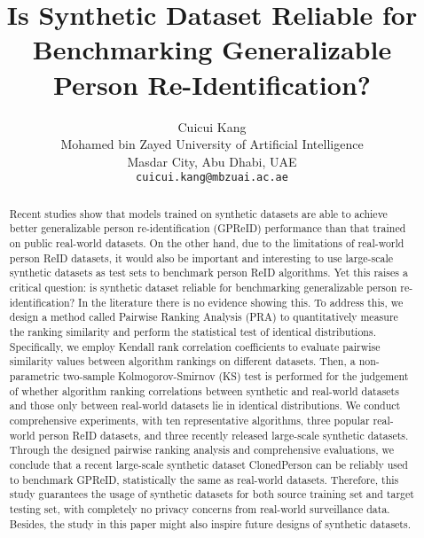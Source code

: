 \documentclass[10pt,twocolumn,letterpaper]{article}
\begin{document}
\title{Is Synthetic Dataset Reliable for Benchmarking Generalizable Person Re-Identification?}

\author{Cuicui Kang\\
Mohamed bin Zayed University of Artificial Intelligence\\
Masdar City, Abu Dhabi, UAE\\
{\tt\small cuicui.kang@mbzuai.ac.ae}
}

\maketitle
\thispagestyle{empty}

\begin{abstract}







Recent studies show that models trained on synthetic datasets are able to achieve better generalizable person re-identification (GPReID) performance than that trained on public real-world datasets. On the other hand, due to the limitations of real-world person ReID datasets, it would also be important and interesting to use large-scale synthetic datasets as test sets to benchmark person ReID algorithms. Yet this raises a critical question: is synthetic dataset reliable for benchmarking generalizable person re-identification? In the literature there is no evidence showing this. To address this, we design a method called Pairwise Ranking Analysis (PRA) to quantitatively measure the ranking similarity and perform the statistical test of identical distributions. Specifically, we employ Kendall rank correlation coefficients to evaluate pairwise similarity values between algorithm rankings on different datasets. Then, a non-parametric two-sample Kolmogorov-Smirnov (KS) test is performed for the judgement of whether algorithm ranking correlations between synthetic and real-world datasets and those only between real-world datasets lie in identical distributions. We conduct comprehensive experiments, with ten representative algorithms, three popular real-world person ReID datasets, and three recently released large-scale synthetic datasets. Through the designed pairwise ranking analysis and comprehensive evaluations, we conclude that a recent large-scale synthetic dataset ClonedPerson can be reliably used to benchmark GPReID, statistically the same as real-world datasets. Therefore, this study guarantees the usage of synthetic datasets for both source training set and target testing set, with completely no privacy concerns from real-world surveillance data. Besides, the study in this paper might also inspire future designs of synthetic datasets.

\end{abstract}
\end{document}
